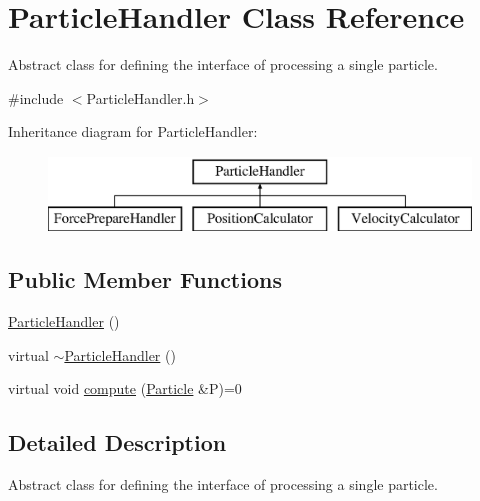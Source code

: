 \hypertarget{classParticleHandler}{\section{Particle\-Handler Class Reference}
\label{classParticleHandler}
}


Abstract class for defining the interface of processing a single particle.  




{\ttfamily \#include $<$Particle\-Handler.\-h$>$}

Inheritance diagram for Particle\-Handler\-:\begin{figure}[H]
\begin{center}
\leavevmode
\includegraphics[height=2.000000cm]{classParticleHandler}
\end{center}
\end{figure}
\subsection*{Public Member Functions}
\begin{DoxyCompactItemize}
\item 
\hyperlink{classParticleHandler_ae5ac096f49d458af0fe833e2e6f7a5da}{Particle\-Handler} ()
\item 
virtual \hyperlink{classParticleHandler_a41036b47d94d6cf24828c294e9704095}{$\sim$\-Particle\-Handler} ()
\item 
virtual void \hyperlink{classParticleHandler_a95783831b8077d447c95ec5e2627c1fa}{compute} (\hyperlink{classParticle}{Particle} \&P)=0
\end{DoxyCompactItemize}


\subsection{Detailed Description}
Abstract class for defining the interface of processing a single particle. 

